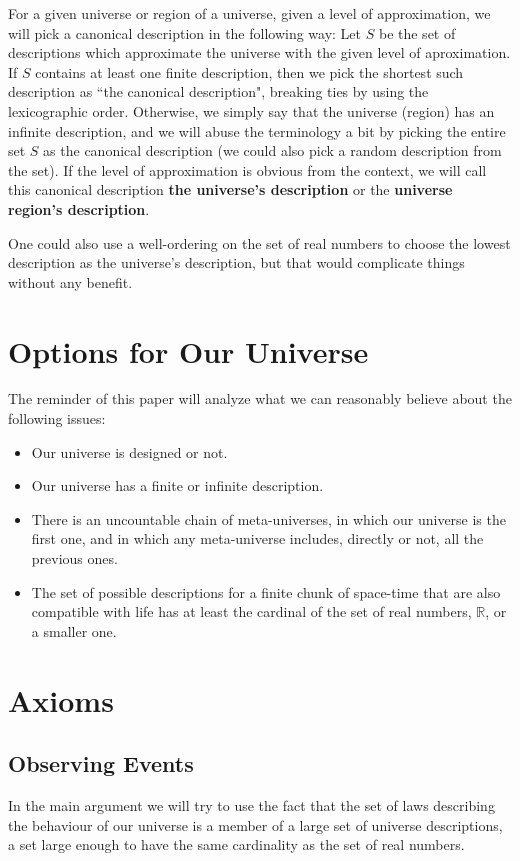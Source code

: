 \documentclass[a4paper
,draft
]{article}
\def\reale{\mathbb{R}}
\newcommand{\definitie}[1]{\textbf{#1}}
\newcommand{\ghilimele}[1]{``#1"}
\begin{document}
For a given universe or region of a universe,
given a level of approximation, we will pick a canonical description
in the following way: Let $S$ be the set of descriptions which approximate
the universe with the given level of aproximation. If $S$ contains
at least one finite description, then we pick the shortest such
description as \ghilimele{the canonical description}, breaking ties by
using the lexicographic order. Otherwise, we simply say that the
universe (region) has an infinite description, and we will abuse the
terminology a bit by picking the entire set
$S$ as the canonical description (we could
also pick a random description from the set).
If the level of approximation is obvious from the context, we will call
this canonical description \definitie{the universe's description}
or the \definitie{universe region's description}.

One could also use a well-ordering on the set of real numbers to choose the
lowest description as the universe's description, but that would
complicate things without any benefit.

\section{Options for Our Universe}
\label{sec:options}

The reminder of this paper will analyze what we can reasonably believe about
the following issues:
\begin{itemize}
  \item Our universe is designed or not.
  \item Our universe has a finite or infinite description.
  \item There is an uncountable chain of meta-universes, in which
        our universe is the first one, and in which any meta-universe
        includes, directly or not, all the previous ones.
  \item The set of possible descriptions for a finite chunk of space-time
        that are also compatible with life has at least the cardinal
        of the set of real numbers, $\reale$, or a smaller one.
\end{itemize}

\section{Axioms}
\label{sec:axioms}

\subsection{Observing Events}
In the main argument we will try to use the fact that the set of laws describing
the behaviour of our universe is a member of a large set of universe
descriptions, a set large enough to have the same cardinality as the set of
real numbers.
\end{document}
